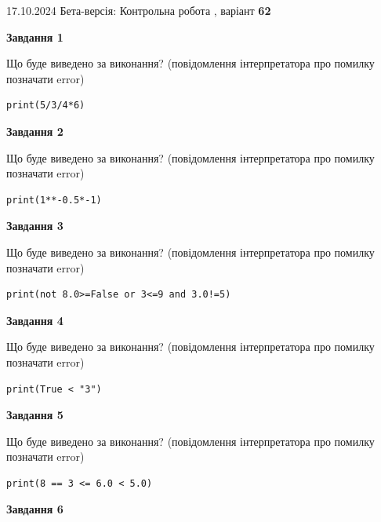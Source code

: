 \documentclass[12pt, ukrainian]{article}
\begin{document}
{\Large{17.10.2024 Бета-версія: Контрольна робота , варіант  \No \textbf { 62 }\par}}
{
\begin {large}
{\begin {center}\textbf{Завдання 1}\end {center}}

Що буде виведено за виконання? (повідомлення інтерпретатора про помилку позначати error)\par
\begin{verbatim}
print(5/3/4*6)
\end{verbatim}

{\begin {center}\textbf{Завдання 2}\end {center}}

Що буде виведено за виконання? (повідомлення інтерпретатора про помилку позначати error)\par
\begin{verbatim}
print(1**-0.5*-1)
\end{verbatim}

{\begin {center}\textbf{Завдання 3}\end {center}}

Що буде виведено за виконання? (повідомлення інтерпретатора про помилку позначати error)\par
\begin{verbatim}
print(not 8.0>=False or 3<=9 and 3.0!=5)
\end{verbatim}

{\begin {center}\textbf{Завдання 4}\end {center}}

Що буде виведено за виконання? (повідомлення інтерпретатора про помилку позначати error)\par
\begin{verbatim}
print(True < "3")
\end{verbatim}

{\begin {center}\textbf{Завдання 5}\end {center}}

Що буде виведено за виконання? (повідомлення інтерпретатора про помилку позначати error)\par
\begin{verbatim}
print(8 == 3 <= 6.0 < 5.0)
\end{verbatim}

{\begin {center}\textbf{Завдання 6}\end {center}}


\end{large}}
\end{document}

